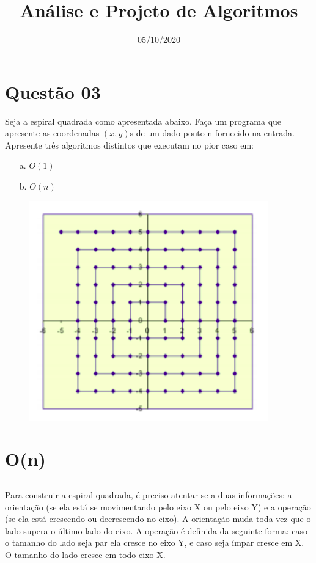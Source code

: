 \documentclass[12pt,a4paper]{article}
\title{Análise e Projeto de Algoritmos}
\date{05/10/2020}
\begin{document}
\section*{Questão 03}
Seja a espiral quadrada como apresentada abaixo. Faça um programa que apresente as coordenadas $(x, y)$s de um dado ponto n fornecido na entrada. Apresente três algoritmos distintos que executam no pior caso em:
\begin{enumerate}
    \item[a.] $O(1)$
    \item[b.] $O(n)$
\end{enumerate}

 \begin{figure}[ht]
    \centering
    \includegraphics[scale=0.7]{espiral.png}
    \label{espiral}
\end{figure}

\section{O(n)}

    \subsection{}
       Para construir a espiral quadrada, é preciso atentar-se a duas informações: a orientação (se ela está se movimentando pelo eixo X ou pelo eixo Y) e a operação (se ela está crescendo ou decrescendo no eixo). A orientação muda toda vez que o lado supera o último lado do eixo. A operação é definida da seguinte forma: caso o tamanho do lado seja par ela cresce no eixo Y, e caso seja ímpar cresce em X. O tamanho do lado cresce em todo eixo X. 
       
\end{document}

